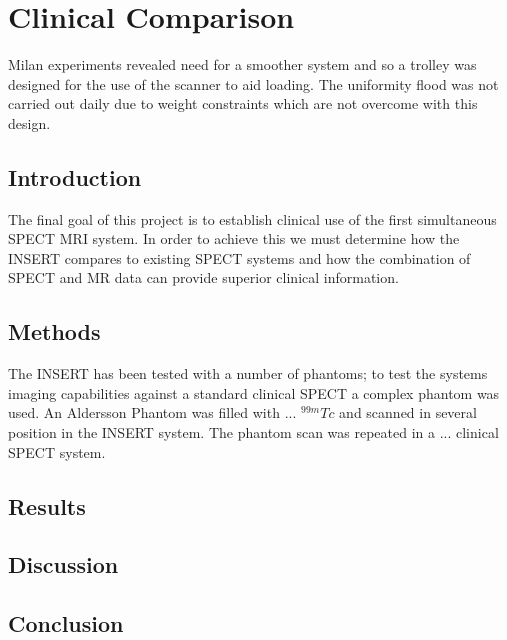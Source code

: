 \chapter{Clinical Comparison}
\label{ClinicalComp}


Milan experiments revealed need for a smoother system and so a trolley was designed for the use of the scanner to aid loading. The uniformity flood was not carried out daily due to weight constraints which are not overcome with this design. 

\section{Introduction}
The final goal of this project is to establish clinical use of the first simultaneous \acrshort{SPECT} MRI system. In order to achieve this we must determine how the INSERT compares to existing SPECT systems and how the combination of SPECT and MR data can provide superior clinical information. 
\section{Methods}
The INSERT has been tested with a number of phantoms; to test the systems imaging capabilities against a standard clinical SPECT a complex phantom was used. An Aldersson Phantom was filled with ... $^{99m}Tc$ and scanned in several position in the INSERT system. The phantom scan was repeated in a ... clinical SPECT system.  
\section{Results}

\section{Discussion}

\section{Conclusion}